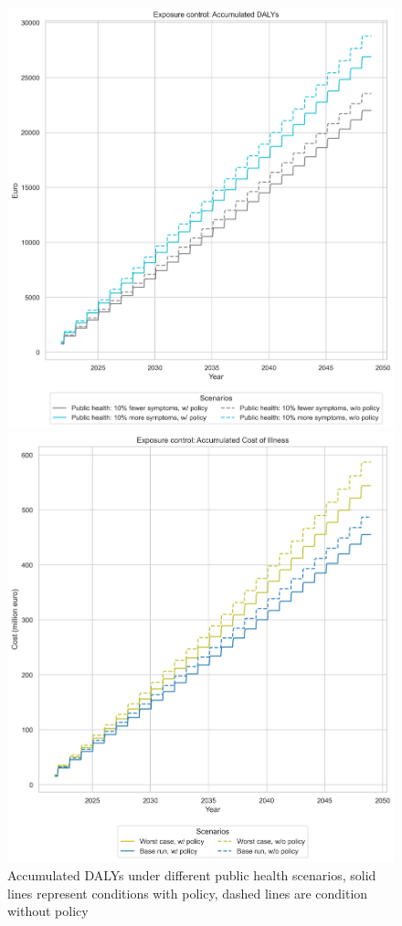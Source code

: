 \begin{figure}[h!]
    \centering
    \begin{minipage}{0.45\textwidth}
        \centering
        \includegraphics[width=1\textwidth]{images/ec_Public health_adaly.png}
        \caption{Accumulated DALYs under different public health scenarios, solid lines represent conditions with policy, dashed lines are condition without policy}
        \label{fig:ec_public_daly}
    \end{minipage}\hfill
    \begin{minipage}{0.45\textwidth}
        \centering
        \includegraphics[width=1\textwidth]{images/ec_Base and Worst Case_acoi.png} 

\end{minipage}
\end{figure}
